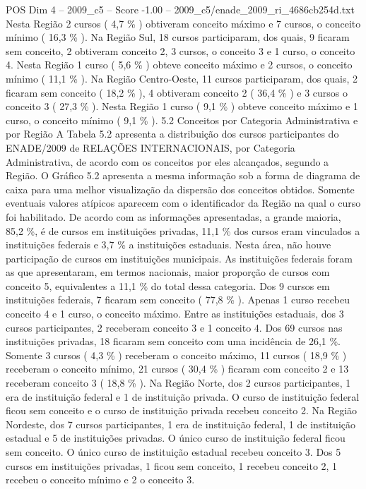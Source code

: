 \begin{textsample}{POS Dim 4 – 2009\_c5 – Score -1.00 – 2009\_c5/enade\_2009\_ri\_4686cb254d.txt}
Nesta Região 2 cursos ( 4,7 \% ) obtiveram conceito máximo e 7 cursos, o conceito mínimo ( 16,3 \% ).
Na Região Sul, 18 cursos participaram, dos quais, 9 ficaram sem conceito, 2 obtiveram conceito 2, 3 cursos, o conceito 3 e 1 curso, o conceito 4.
Nesta Região 1 curso ( 5,6 \% ) obteve conceito máximo e 2 cursos, o conceito mínimo ( 11,1 \% ).
Na Região Centro-Oeste, 11 cursos participaram, dos quais, 2 ficaram sem conceito ( 18,2 \% ), 4 obtiveram conceito 2 ( 36,4 \% ) e 3 cursos o conceito 3 ( 27,3 \% ).
Nesta Região 1 curso ( 9,1 \% ) obteve conceito máximo e 1 curso, o conceito mínimo ( 9,1 \% ). 5.2 Conceitos por Categoria Administrativa e por Região A Tabela 5.2 apresenta a distribuição dos cursos participantes do ENADE/2009 de RELAÇÕES INTERNACIONAIS, por Categoria Administrativa, de acordo com os conceitos por eles alcançados, segundo a Região.
O Gráfico 5.2 apresenta a mesma informação sob a forma de diagrama de caixa para uma melhor visualização da dispersão dos conceitos obtidos.
Somente eventuais valores atípicos aparecem com o identificador da Região na qual o curso foi habilitado.
De acordo com as informações apresentadas, a grande maioria, 85,2 \%, é de cursos em instituições privadas, 11,1 \% dos cursos eram vinculados a instituições federais e 3,7 \% a instituições estaduais.
Nesta área, não houve participação de cursos em instituições municipais.
As instituições federais foram as que apresentaram, em termos nacionais, maior proporção de cursos com conceito 5, equivalentes a 11,1 \% do total dessa categoria.
Dos 9 cursos em instituições federais, 7 ficaram sem conceito ( 77,8 \% ).
Apenas 1 curso recebeu conceito 4 e 1 curso, o conceito máximo.
Entre as instituições estaduais, dos 3 cursos participantes, 2 receberam conceito 3 e 1 conceito 4.
Dos 69 cursos nas instituições privadas, 18 ficaram sem conceito com uma incidência de 26,1 \%.
Somente 3 cursos ( 4,3 \% ) receberam o conceito máximo, 11 cursos ( 18,9 \% ) receberam o conceito mínimo, 21 cursos ( 30,4 \% ) ficaram com conceito 2 e 13 receberam conceito 3 ( 18,8 \% ).
Na Região Norte, dos 2 cursos participantes, 1 era de instituição federal e 1 de instituição privada.
O curso de instituição federal ficou sem conceito e o curso de instituição privada recebeu conceito 2.
Na Região Nordeste, dos 7 cursos participantes, 1 era de instituição federal, 1 de instituição estadual e 5 de instituições privadas.
O único curso de instituição federal ficou sem conceito.
O único curso de instituição estadual recebeu conceito 3.
Dos 5 cursos em instituições privadas, 1 ficou sem conceito, 1 recebeu conceito 2, 1 recebeu o conceito mínimo e 2 o conceito 3.

\end{textsample}

